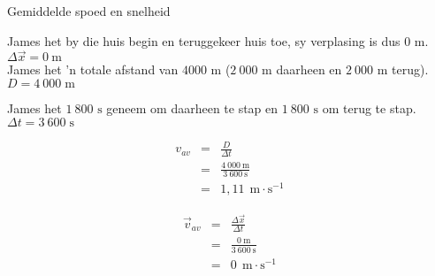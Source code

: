 \begin{wex}{Gemiddelde spoed en snelheid}
{
James het by die huis begin en teruggekeer huis toe, sy verplasing is dus 0 m.
$\Delta \vec{x} = 0\ \text{m}$\\
James het 'n totale afstand van $4 000 \text{ m}$ ($2\ 000\text{ m}$ daarheen en $2\ 000\text{ m}$ terug).\\
$D = 4\ 000\;\text{m}$
 
James het $1~800\text{ s}$ geneem om daarheen te stap en $1~800\text{ s}$ om terug te stap.\\
$\Delta t = 3\ 600\;\text{s}$

\begin{eqnarray*}
v_{av}&=&\frac{D}{\Delta t}\\
&=&\frac{4\ 000\ \text{m}}{3\ 600\ \text{s}}\\
&=&1,11\ ~\text{m}\cdot \text{s}^{-1}
\end{eqnarray*}

\begin{eqnarray*}
{\vec{v}_{av}}&=&\frac{\Delta \vec{x}}{\Delta t}\\
&=&\frac{0\ \text{m}}{3\ 600\ \text{s}}\\
&=& 0\ ~\text{m}\cdot \text{s}^{-1}
\end{eqnarray*}}
\end{wex}



